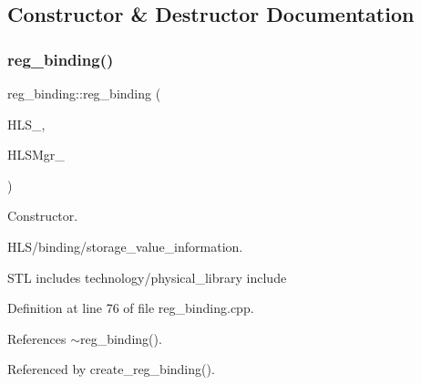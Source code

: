 \subsection{Constructor \& Destructor Documentation}
\mbox{\label{classreg__binding_ae694dc53d5c425815130c00a5fdef84e}} 
\subsubsection{\texorpdfstring{reg\+\_\+binding()}{reg\_binding()}}
{\footnotesize\ttfamily reg\+\_\+binding\+::reg\+\_\+binding (\begin{DoxyParamCaption}\item[{const \hyperlink{hls_8hpp_a75d0c73923d0ddfa28c4843a802c73a7}{hls\+Ref} \&}]{H\+L\+S\+\_\+,  }\item[{const \hyperlink{hls__manager_8hpp_acd3842b8589fe52c08fc0b2fcc813bfe}{H\+L\+S\+\_\+manager\+Ref}}]{H\+L\+S\+Mgr\+\_\+ }\end{DoxyParamCaption})}



Constructor. 

H\+L\+S/binding/storage\+\_\+value\+\_\+information.

S\+TL includes technology/physical\+\_\+library include 

Definition at line 76 of file reg\+\_\+binding.\+cpp.



References $\sim$reg\+\_\+binding().



Referenced by create\+\_\+reg\+\_\+binding().

